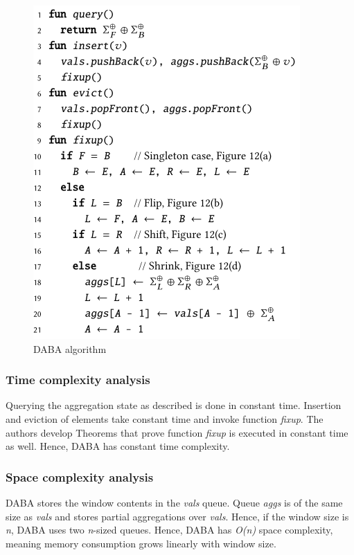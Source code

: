 \begin{figure}[!htb]
    \begin{center}
      \includegraphics[scale=0.7]{figures/daba-pseudocode.png}
      \caption{DABA algorithm}
      \label{fig:pseudo-daba}
    \end{center}
\end{figure}


\subsubsection*{Time complexity analysis}
Querying the aggregation state as described is done in constant time. Insertion and eviction of elements take constant time and invoke function \textit{fixup}. The authors develop Theorems that prove function \textit{fixup} is executed in constant time as well. Hence, DABA has constant time complexity.

\subsubsection*{Space complexity analysis}
DABA stores the window contents in the \textit{vals} queue. Queue \textit{aggs} is of the same size as \textit{vals} and stores partial aggregations over \textit{vals}. Hence, if the window size is \textit{n}, DABA uses two \textit{n}-sized queues. Hence, DABA has \textit{O(n)} space complexity, meaning memory consumption grows linearly with window size.

